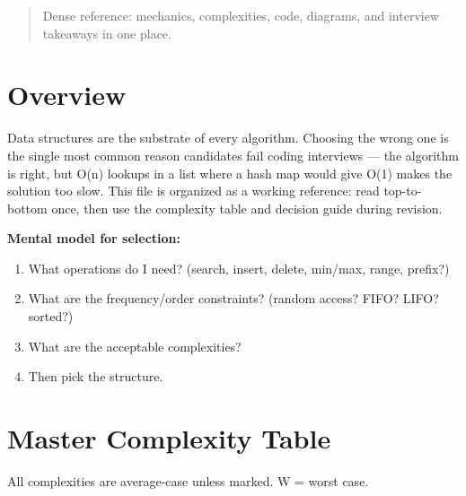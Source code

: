 \documentclass[11pt]{article}
\providecommand{\tightlist}{\setlength{\itemsep}{1pt}\setlength{\parskip}{0pt}}
\begin{document}
\makecoverpage

\thispagestyle{empty}
{\hypersetup{hidelinks}\tableofcontents}
\clearpage

\begin{quote}
Dense reference: mechanics, complexities, code, diagrams, and interview takeaways in one place.
\end{quote}

\section{Overview}\label{overview}

Data structures are the substrate of every algorithm. Choosing the wrong one is the single most common reason candidates fail coding interviews --- the algorithm is right, but O(n) lookups in a list where a hash map would give O(1) makes the solution too slow. This file is organized as a working reference: read top-to-bottom once, then use the complexity table and decision guide during revision.

\textbf{Mental model for selection:}

\begin{enumerate}
\def\labelenumi{\arabic{enumi}.}
\tightlist
\item
  What operations do I need? (search, insert, delete, min/max, range, prefix?)
\item
  What are the frequency/order constraints? (random access? FIFO? LIFO? sorted?)
\item
  What are the acceptable complexities?
\item
  Then pick the structure.
\end{enumerate}

\section{Master Complexity Table}\label{master-complexity-table}


All complexities are average-case unless marked. W = worst case.
\end{document}
